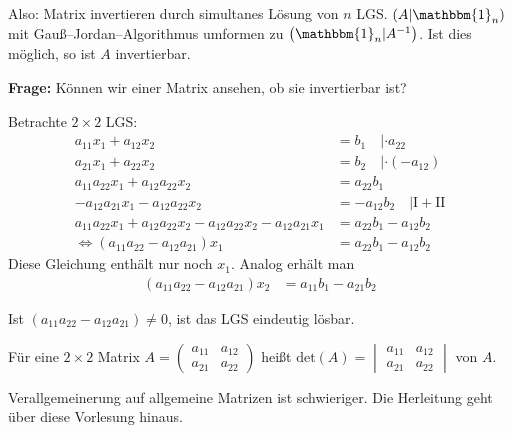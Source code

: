 Also: Matrix invertieren durch simultanes Lösung von $n$ LGS. $\left(A|\mathbbm{1}_n\right)$ mit Gauß--Jordan--Algorithmus umformen zu $\left(\mathbbm{1}_n|A^{-1}\right)$. Ist dies möglich, so ist $A$ invertierbar.

\vspace{0.5cm}

\textbf{Frage:} Können wir einer Matrix \glqq{}ansehen\grqq{}, ob sie invertierbar ist?

Betrachte $2 \times 2$ LGS:
\begin{align*}
	a_{11}x_1 + a_{12}x_2 &= b_1\quad |\cdot a_{22} \\
	a_{21}x_1 + a_{22}x_2 &= b_2\quad |\cdot (-a_{12}) \\[0.5cm]
	a_{11}a_{22}x_1 + a_{12}a_{22}x_2 &= a_{22}b_1 \\
	-a_{12}a_{21}x_1 - a_{12}a_{22}x_2 &= -a_{12}b_2 \quad |\text{I} + \text{II} \\[0.5cm]
	a_{11}a_{22}x_1 + a_{12}a_{22}x_2 - a_{12}a_{22}x_2 - a_{12}a_{21}x_1 &= a_{22}b_1 - a_{12}b_2 \\
	\Leftrightarrow (a_{11}a_{22}-a_{12}a_{21}) x_1 &= a_{22}b_1 - a_{12}b_{2}
\end{align*}
Diese Gleichung enthält nur noch $x_1$. Analog erhält man
\begin{align*}
	(a_{11}a_{22}-a_{12}a_{21}) x_2 &= a_{11}b_1 - a_{21}b_{2}
\end{align*}

Ist $(a_{11}a_{22}-a_{12}a_{21}) \neq 0$, ist das LGS eindeutig lösbar.

Für eine $2 \times 2$ Matrix $A = \begin{pmatrix}a_{11} & a_{12} \\ a_{21} & a_{22}\end{pmatrix}$ heißt $\text{det}(A) = \begin{vmatrix}a_{11} & a_{12} \\ a_{21} & a_{22}\end{vmatrix}$  von $A$.

Verallgemeinerung auf allgemeine Matrizen ist schwieriger. Die Herleitung geht über diese Vorlesung hinaus.
